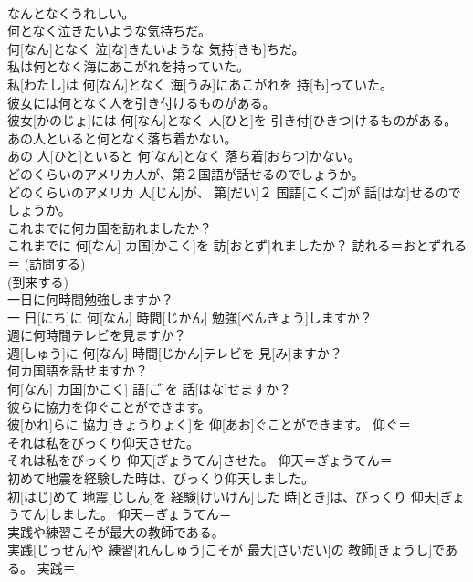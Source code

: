 \documentclass[8pt]{extreport}
\begin{document}
\begin{CJK}{UTF8}{min}
\\	なんとなくうれしい。	
\\	何となく泣きたいような気持ちだ。	
\\	何[なん]となく 泣[な]きたいような 気持[きも]ちだ。	
\\	私は何となく海にあこがれを持っていた。	
\\	私[わたし]は 何[なん]となく 海[うみ]にあこがれを 持[も]っていた。	
\\	彼女には何となく人を引き付けるものがある。	
\\	彼女[かのじょ]には 何[なん]となく 人[ひと]を 引き付[ひきつ]けるものがある。	
\\	あの人といると何となく落ち着かない。	
\\	あの 人[ひと]といると 何[なん]となく 落ち着[おちつ]かない。	
\\	どのくらいのアメリカ人が、第２国語が話せるのでしょうか。	
\\	どのくらいのアメリカ 人[じん]が、 第[だい]２ 国語[こくご]が 話[はな]せるのでしょうか。	
\\	これまでに何カ国を訪れましたか？	
\\	これまでに 何[なん] カ国[かこく]を 訪[おとず]れましたか？	訪れる＝おとずれる＝ (訪問する) 
\\	(到来する) 
\\	一日に何時間勉強しますか？	
\\	一 日[にち]に 何[なん] 時間[じかん] 勉強[べんきょう]しますか？	
\\	週に何時間テレビを見ますか？	
\\	週[しゅう]に 何[なん] 時間[じかん]テレビを 見[み]ますか？	
\\	何カ国語を話せますか？	
\\	何[なん] カ国[かこく] 語[ご]を 話[はな]せますか？	
\\	彼らに協力を仰ぐことができます。	
\\	彼[かれ]らに 協力[きょうりょく]を 仰[あお]ぐことができます。	仰ぐ＝ 
\\	それは私をびっくり仰天させた。	
\\	それは私をびっくり 仰天[ぎょうてん]させた。	仰天＝ぎょうてん＝ 
\\	初めて地震を経験した時は、びっくり仰天しました。	
\\	初[はじ]めて 地震[じしん]を 経験[けいけん]した 時[とき]は、びっくり 仰天[ぎょうてん]しました。	仰天＝ぎょうてん＝ 
\\	実践や練習こそが最大の教師である。	
\\	実践[じっせん]や 練習[れんしゅう]こそが 最大[さいだい]の 教師[きょうし]である。	実践＝ 

\end{CJK}
\end{document}
